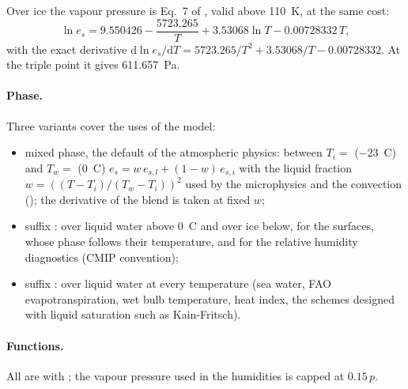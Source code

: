 Over ice the vapour pressure is Eq.~7 of \citet{murphy2005}, valid above
110~K, at the same cost:
\begin{equation}
  \ln e_s = 9.550426 - \frac{5723.265}{T} + 3.53068 \ln T - 0.00728332\,T,
\end{equation}
with the exact derivative
$\mathrm{d}\ln e_s/\mathrm{d}T = 5723.265/T^2 + 3.53068/T - 0.00728332$.
At the triple point it gives 611.657~Pa.

\paragraph{Phase.}
Three variants cover the uses of the model:
\begin{itemize}
  \item mixed phase, the default of the atmospheric physics: between
    $T_i = $  ($-23$~\textdegree C) and $T_w = $ 
    (0~\textdegree C) $e_s = w\,e_{s,l} + (1-w)\,e_{s,i}$ with the liquid
    fraction $w = ((T-T_i)/(T_w-T_i))^2$ used by the microphysics and the
    convection (); the derivative of the blend is taken at
    fixed $w$;
  \item suffix : over liquid water above 0~\textdegree C and over ice
    below, for the surfaces, whose phase follows their temperature, and for
    the relative humidity diagnostics (CMIP convention);
  \item suffix : over liquid water at every temperature (sea water,
    FAO evapotranspiration, wet bulb temperature, heat index, the schemes
    designed with liquid saturation such as Kain-Fritsch).
\end{itemize}

\paragraph{Functions.}
All are  with ; the vapour
pressure used in the humidities is capped at $0.15\,p$.

